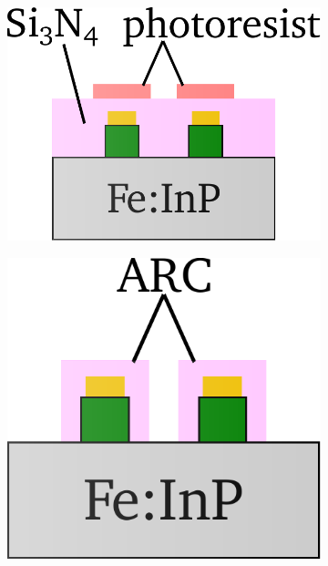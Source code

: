 \begin{figure}[!]
    \centering
    \begin{subfigure}[b]{0.21\textwidth}
        \centering
        \includegraphics[height=\textwidth]{figures/Fabrication/ARC_deposition_1.pdf}
        \caption{\centering}
        \label{fig:fabarc1}
    \end{subfigure}
    \hfill
    \begin{subfigure}[b]{0.21\textwidth}
        \centering
        \includegraphics[height=0.95\textwidth]{figures/Fabrication/ARC_deposition_2.pdf}

\end{subfigure}
\end{figure}
